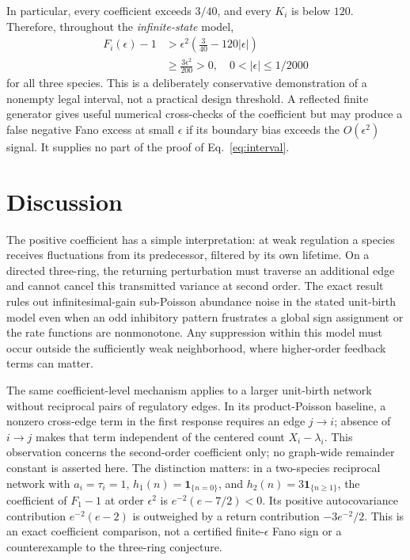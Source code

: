 \documentclass[aps,pre,twocolumn,showpacs,amsmath,amssymb]{revtex4-2}
\begin{document}
In particular, every coefficient exceeds $3/40$, and every $K_i$ is below $120$. Therefore, throughout the \emph{infinite-state} model,
\begin{align}
F_i(\epsilon)-1&>\epsilon^2\left(\frac3{40}-120|\epsilon|\right)\nonumber\\
&\geq\frac{3\epsilon^2}{200}>0,
\quad 0<|\epsilon|\leq1/2000
\label{eq:interval}
\end{align}
for all three species. This is a deliberately conservative demonstration of a nonempty legal interval, not a practical design threshold. A reflected finite generator gives useful numerical cross-checks of the coefficient but may produce a false negative Fano excess at small $\epsilon$ if its boundary bias exceeds the $O(\epsilon^2)$ signal. It supplies no part of the proof of Eq.~\eqref{eq:interval}.

\section{Discussion}
The positive coefficient has a simple interpretation: at weak regulation a species receives fluctuations from its predecessor, filtered by its own lifetime. On a directed three-ring, the returning perturbation must traverse an additional edge and cannot cancel this transmitted variance at second order. The exact result rules out infinitesimal-gain sub-Poisson abundance noise in the stated unit-birth model even when an odd inhibitory pattern frustrates a global sign assignment or the rate functions are nonmonotone. Any suppression within this model must occur outside the sufficiently weak neighborhood, where higher-order feedback terms can matter.

The same coefficient-level mechanism applies to a larger unit-birth network without reciprocal pairs of regulatory edges. In its product-Poisson baseline, a nonzero cross-edge term in the first response requires an edge $j\to i$; absence of $i\to j$ makes that term independent of the centered count $X_i-\lambda_i$. This observation concerns the second-order coefficient only; no graph-wide remainder constant is asserted here. The distinction matters: in a two-species reciprocal network with $a_i=\tau_i=1$, $h_1(n)=\mathbf1_{\{n=0\}}$, and $h_2(n)=3\mathbf1_{\{n\geq1\}}$, the coefficient of $F_1-1$ at order $\epsilon^2$ is $e^{-2}(e-7/2)<0$. Its positive autocovariance contribution $e^{-2}(e-2)$ is outweighed by a return contribution $-3e^{-2}/2$. This is an exact coefficient comparison, not a certified finite-$\epsilon$ Fano sign or a counterexample to the three-ring conjecture.
\end{document}
